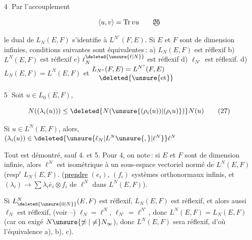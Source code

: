
\textcircled{4} Par l'accouplement 

\[
\langle u,v\rangle=\operatorname{Tr}vu\tag*{\textcircled{26}}
\]

le dual de $L_N(E,F)$ s'identifie à $L^{N^\circ}(F,E)$. Si $E$ et $F$ sont de dimension infinies,   conditions suivantes sont équivalentes\,: a) $L_N(E,F)$ est réflexif  b) $L^N(E,F)$ est réflexif c) $\ell^{\deleted{\unsure{\ell|N}}}_{N}$ est réflexif  d) $\ell_{N'}$ est réflexif.   d) $L_N(E,F)=L^N(E,F)$ et $\begin{aligned}&L_{N^\circ}(F,E)=L^{N^\circ}(F,E)\\[-0.5ex]&\quad\text{\deleted{\unsure{et}}}\end{aligned}$

\textcircled{5}  Soit $u\in L_0(E,F)$,  

\[
N((\lambda_i(u)))\leq\deleted{N(\unsure{(\rho_i(u))|(\rho_i u)})}N(u)\tag*{(27)}
\]

Si $u\in L^N(E,F)$,  alors, $(\lambda_i(u))\in\deleted{\unsure{\ell_N|L^N\unsure{,}|\ell^N}}\ell^N$ 

Tout est démontré, sauf 4.  et 5. Pour 4, on note\,: si $E$ et $F$ sont de dimension infinie, alors $\ell^N$  est isométrique à un sous-espace vectoriel normé de $L^N(E,F)$ (resp$^t$ $L_N(E,F)$. (\textcolor{red}{\uline{\textcolor{black}{prendre}}} $(e_i)$, $(f_i)$ systèmes orthonormaux infinis, et $(\lambda_i)\to\sum\lambda_i\bar e_i\otimes f_i$ de $\ell^N$ dans $L^N(E,F)$). 

Si $L^N_{\deleted{\unsure{0|N}}}(E,F)$ est réflexif, $L_N(E,F)$ est réflexif, et alors aussi $\ell_N$ est réflexif,  (voir --) $\ell_N=\ell^N$, $\ell_{N^\circ}=\ell^{N^\circ}$, donc $L^N(E,F)=L_N(E,F)$ (car on  exigé $N\unsure{\not\simeq|\neq}N_\infty$), donc $L^N(E,F)$ sera réflexif, d'où l'équivalence a), b), c).

